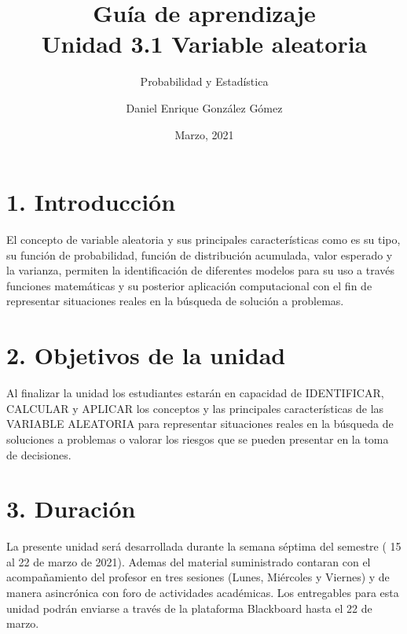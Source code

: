 \documentclass[base=hide,11pt]{elegantbook}
\title{Guía de  aprendizaje\\
	Unidad  3.1 Variable aleatoria}
\subtitle{Probabilidad y Estadística}
\author{Daniel Enrique González Gómez}
\institute{Pontificia Universidad Javeriana Cali}
\date{Marzo, 2021}
\begin{document}

\maketitle

\frontmatter
%
\mainmatter
\section*{1. Introducción}
El concepto de variable  aleatoria  y sus principales características como es su tipo, su función de probabilidad, función de distribución acumulada,  valor esperado y la varianza, permiten la identificación de diferentes modelos para su uso a través funciones matemáticas y su posterior aplicación  computacional con el fin de representar situaciones reales en la búsqueda de solución a problemas. 


\section*{2. Objetivos de la unidad}

Al finalizar la unidad los estudiantes estarán  en  capacidad de IDENTIFICAR, CALCULAR y APLICAR los conceptos y las principales características  de las VARIABLE ALEATORIA para representar situaciones reales en la búsqueda de soluciones a problemas o valorar los riesgos que se pueden presentar en la toma de decisiones.


\section*{3. Duración}
La presente  unidad será desarrollada durante la semana séptima del semestre ( 15 al 22 de marzo  de 2021). Ademas del material suministrado  contaran con el acompañamiento del profesor en tres sesiones (Lunes, Miércoles y Viernes) y de manera asincrónica con  foro de actividades académicas. Los entregables para esta unidad podrán enviarse a través de la plataforma Blackboard hasta el  22 de marzo.
\end{document}

